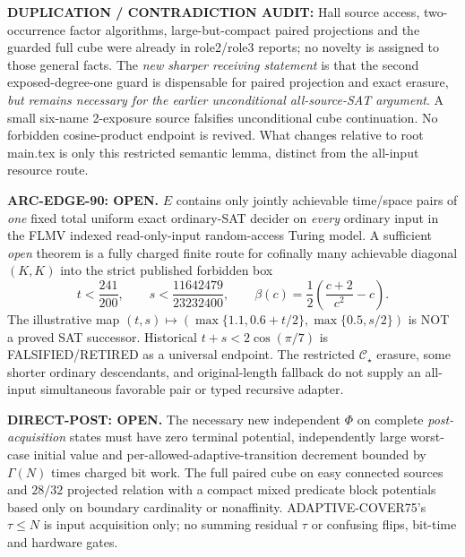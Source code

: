 \documentclass[11pt]{article}
\newcommand{\CS}{\mathcal C_{\star}}
\begin{document}
\noindent\textbf{DUPLICATION / CONTRADICTION AUDIT:} Hall source access, two-occurrence factor algorithms, large-but-compact paired projections and the guarded full cube were already in role2/role3 reports; no novelty is assigned to those general facts. The \emph{new sharper receiving statement} is that the second exposed-degree-one guard is dispensable for paired projection and exact erasure, \emph{but remains necessary for the earlier unconditional all-source-SAT argument}. A small six-name 2-exposure source falsifies unconditional cube continuation. No forbidden cosine-product endpoint is revived. What changes relative to root main.tex is only this restricted semantic lemma, distinct from the all-input resource route.

\noindent\textbf{ARC-EDGE-90: OPEN.} $E$ contains only jointly achievable time/space pairs of \emph{one} fixed total uniform exact ordinary-SAT decider on \emph{every} ordinary input in the FLMV indexed read-only-input random-access Turing model. A sufficient \emph{open} theorem is a fully charged finite route for cofinally many achievable diagonal $(K,K)$ into the strict published forbidden box
\[
t<\frac{241}{200},\qquad s<\frac{11642479}{23232400},\qquad
\beta(c)=\frac12\left(\frac{c+2}{c^2}-c\right).
\]
The illustrative map $(t,s)\mapsto(\max\{1.1,0.6+t/2\},\max\{0.5,s/2\})$ is NOT a proved SAT successor. Historical $t+s<2\cos(\pi/7)$ is FALSIFIED/RETIRED as a universal endpoint. The restricted $\CS$ erasure, some shorter ordinary descendants, and original-length fallback do not supply an all-input simultaneous favorable pair or typed recursive adapter.

\noindent\textbf{DIRECT-POST: OPEN.} The necessary new independent $\Phi$ on complete \emph{post-acquisition} states must have zero terminal potential, independently large worst-case initial value and per-allowed-adaptive-transition decrement bounded by $\Gamma(N)$ times charged bit work. The full paired cube on easy connected sources and $28/32$ projected relation with a compact mixed predicate block potentials based only on boundary cardinality or nonaffinity. ADAPTIVE-COVER75's $\tau\le N$ is input acquisition only; no summing residual $\tau$ or confusing flips, bit-time and hardware gates.
\end{document}
